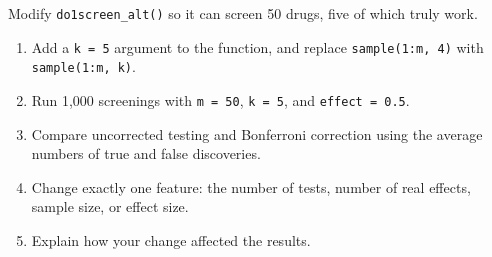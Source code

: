 \begin{exercise}
Modify \lstinline{do1screen_alt()} so it can screen 50 drugs, five of
which truly work.
\begin{enumerate}[label=(\alph*)]
\item Add a \lstinline{k = 5} argument to the function, and replace
  \lstinline{sample(1:m, 4)} with \lstinline{sample(1:m, k)}.
\item Run 1,000 screenings with \lstinline{m = 50}, \lstinline{k = 5},
  and \lstinline{effect = 0.5}.
\item Compare uncorrected testing and Bonferroni correction using the
  average numbers of true and false discoveries.
\item Change exactly one feature: the number of tests, number of real
  effects, sample size, or effect size.
\item Explain how your change affected the results.
\end{enumerate}
\end{exercise}


